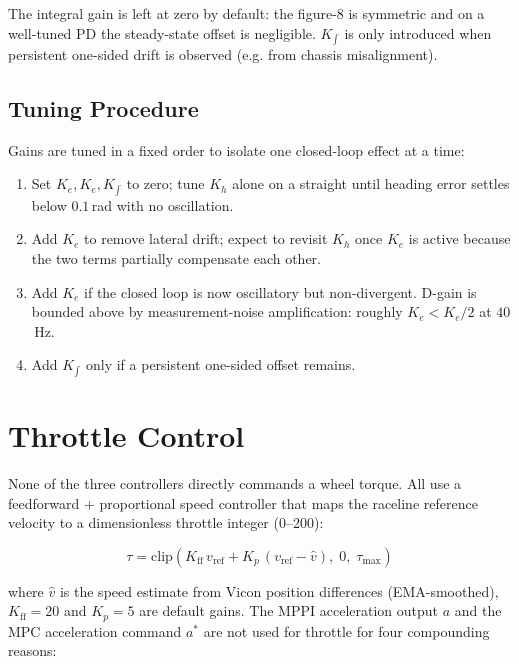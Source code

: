 \documentclass[11pt]{article}
\begin{document}
The integral gain is left at zero by default: the figure-8 is symmetric and
on a well-tuned PD the steady-state offset is negligible.  $K_{\int}$ is only
introduced when persistent one-sided drift is observed (e.g. from chassis
misalignment).

\subsection{Tuning Procedure}

Gains are tuned in a fixed order to isolate one closed-loop effect at a time:

\begin{enumerate}
  \item Set $K_e, K_{\dot e}, K_{\int}$ to zero; tune $K_h$ alone on a straight
        until heading error settles below $0.1$\,rad with no oscillation.
  \item Add $K_e$ to remove lateral drift; expect to revisit $K_h$ once $K_e$
        is active because the two terms partially compensate each other.
  \item Add $K_{\dot e}$ if the closed loop is now oscillatory but
        non-divergent.  D-gain is bounded above by measurement-noise
        amplification: roughly $K_{\dot e} < K_e / 2$ at $40$\,Hz.
  \item Add $K_{\int}$ only if a persistent one-sided offset remains.
\end{enumerate}



\section{Throttle Control}

None of the three controllers directly commands a wheel torque.  All use a
feedforward + proportional speed controller that maps the raceline
reference velocity to a dimensionless throttle integer (0--200):

\[
\tau = \mathrm{clip}\!\left(K_{\mathrm{ff}}\, v_{\mathrm{ref}} + K_p\,(v_{\mathrm{ref}} - \hat{v}),\; 0,\; \tau_{\max}\right)
\]

where $\hat{v}$ is the speed estimate from Vicon position differences
(EMA-smoothed), $K_{\mathrm{ff}} = 20$ and $K_p = 5$ are default gains.
The MPPI acceleration output $a$ and the MPC acceleration command $a^*$ are
not used for throttle for four compounding reasons:
\end{document}
